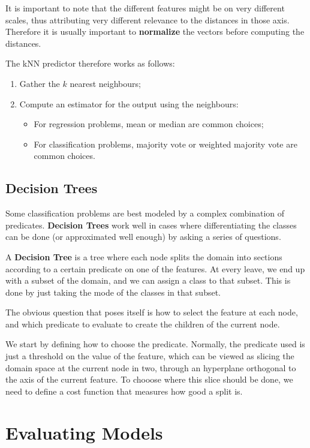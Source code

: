 \documentclass{article}
\begin{document}
It is important to note that the different features might be on very different scales, thus attributing very different relevance to the distances in those axis.
Therefore it is usually important to \textbf{normalize} the vectors before computing the distances.

The kNN predictor therefore works as follows:
\begin{enumerate}
\item Gather the $k$ nearest neighbours;
\item Compute an estimator for the output using the neighbours:
\begin{itemize}
\item For regression problems, mean or median are common choices;
\item For classification problems, majority vote or weighted majority vote are common choices.
\end{itemize}
\end{enumerate}

\subsection{Decision Trees}

Some classification problems are best modeled by a complex combination of predicates.
\textbf{Decision Trees} work well in cases where differentiating the classes can be done (or approximated well enough) by asking a series of questions.

A \textbf{Decision Tree} is a tree where each node splits the domain into sections according to a certain predicate on one of the features.
At every leave, we end up with a subset of the domain, and we can assign a class to that subset.
This is done by just taking the mode of the classes in that subset.

The obvious question that poses itself is how to select the feature at each node, and which predicate to evaluate to create the children of the current node.

We start by defining how to choose the predicate.
Normally, the predicate used is just a threshold on the value of the feature, which can be viewed as slicing the domain space at the current node in two, through an hyperplane orthogonal to the axis of the current feature.
To chooose where this slice should be done, we need to define a cost function that measures how good a split is.

\section{Evaluating Models}
\end{document}
